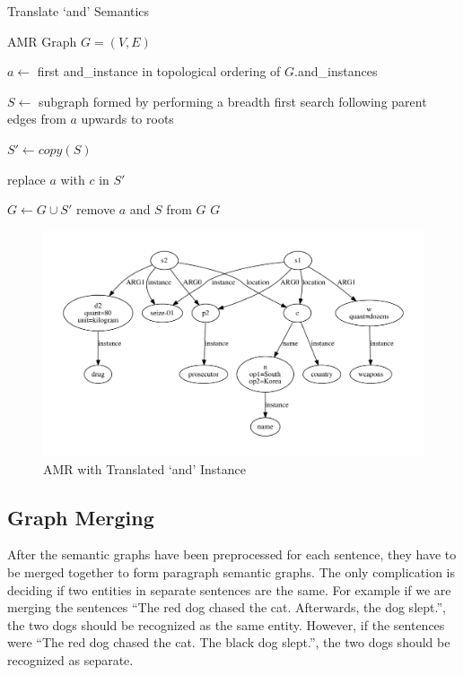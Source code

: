 \documentclass[12pt]{article}
\begin{document}
\begin{algorithm}
\caption{Translate `and' Semantics}
\label{alg:translate_and_semantics}
\begin{algorithmic}[1]
\REQUIRE AMR Graph $G = (V, E)$

    \STATE $a \gets$ first and\_instance in topological ordering of $G$.and\_instances

    \STATE $S \gets$ subgraph formed by performing a breadth first search following parent edges from $a$ upwards to roots

        \STATE $S' \gets copy(S)$

        \STATE replace $a$ with $c$ in $S'$

        \STATE $G \gets G \cup S'$
    \ENDFOR
    \STATE remove $a$ and $S$ from $G$
\ENDWHILE
\RETURN $G$
\end{algorithmic}
\end{algorithm}

\begin{figure}
\includegraphics[width=\linewidth]{amr_example_and_removed.pdf}
\caption{AMR with Translated `and' Instance}
\label{fig:amr_example_and_removed}
\end{figure}

\subsection{Graph Merging}
After the semantic graphs have been preprocessed for each sentence, they have to be merged together to form paragraph semantic graphs. The only complication is deciding if two entities in separate sentences are the same. For example if we are merging the sentences ``The red dog chased the cat. Afterwards, the dog slept.'', the two dogs should be recognized as the same entity. However, if the sentences were ``The red dog chased the cat. The black dog slept.'', the two dogs should be recognized as separate. 
\end{document}
